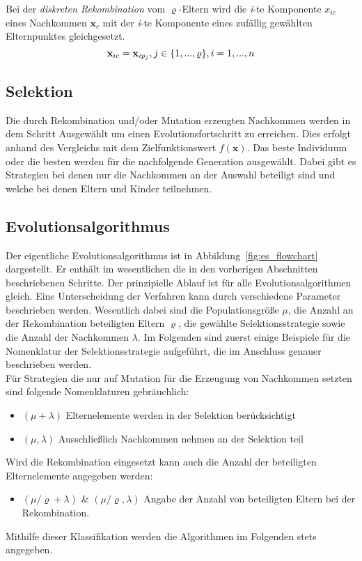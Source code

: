 Bei der \textit{diskreten Rekombination} vom $\varrho$-Eltern wird die \textit{i}-te Komponente $x_{ic}$ eines Nachkommen $\mathbf{x}_c$ mit der \textit{i}-te Komponente eines zufällig gewählten Elternpunktes gleichgesetzt.
%
\begin{equation}
\mathbf{x}_{ic} = \mathbf{x}_{ip_j},\\ j\in\{1,...,\varrho\},\\i=1,...,n
\end{equation} 
%
\subsection[Selektion]{Selektion}
Die durch Rekombination und/oder Mutation erzeugten Nachkommen werden in dem Schritt Ausgewählt um einen Evolutionsfortschritt zu erreichen. Dies erfolgt anhand des Vergleichs mit dem Zielfunktionswert $f(\mathbf{x})$. Das beste Individuum oder die besten werden für die nachfolgende Generation ausgewählt. Dabei gibt es Strategien bei denen nur die Nachkommen an der Auswahl beteiligt sind und welche bei denen Eltern und Kinder teilnehmen.

\subsection{Evolutionsalgorithmus}
%
Der eigentliche Evolutionsalgorithmus ist in Abbildung~\ref{fig:es_flowchart} dargestellt. Er enthält im wesentlichen die in den vorherigen Abschnitten beschriebenen Schritte. Der prinzipielle Ablauf ist für alle Evolutionsalgorithmen gleich. Eine Unterscheidung der Verfahren kann durch verschiedene Parameter beschrieben werden. Wesentlich dabei sind die Populationsgröße $\mu$, die Anzahl an der Rekombination beteiligten Eltern $\varrho$, die gewählte Selektionsstrategie sowie die Anzahl der Nachkommen $\lambda$. Im Folgenden sind zuerst einige Beispiele für die Nomenklatur der Selektionsstrategie aufgeführt, die im Anschluss genauer beschrieben werden.\\
Für Strategien die nur auf Mutation für die Erzeugung von Nachkommen setzten sind folgende Nomenklaturen gebräuchlich:
\begin{itemize}
\item $(\mu+\lambda)$ Elternelemente werden in der Selektion berücksichtigt
\item $(\mu,\lambda)$ Ausschließlich Nachkommen nehmen an der Selektion teil
\end{itemize}
%
Wird die Rekombination eingesetzt kann auch die Anzahl der beteiligten Elternelemente angegeben werden:
\begin{itemize}
\item $({\mu}/{\varrho}+\lambda)$ \& $({\mu}/{\varrho},\lambda)$ Angabe der Anzahl von beteiligten Eltern bei der Rekombination.
\end{itemize}
%
Mithilfe dieser Klassifikation werden die Algorithmen im Folgenden stets angegeben.



